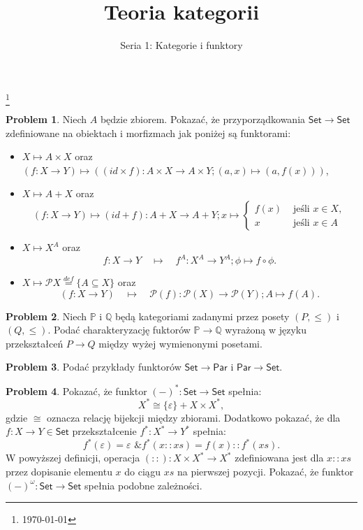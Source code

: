 \documentclass[10pt]{amsart}
\title{Teoria kategorii}
\author{Seria 1: Kategorie i funktory}
\theoremstyle{plain}
\theoremstyle{definition}
\newtheorem{problem}{Problem}
\numberwithin{equation}{section}
\newcommand\blfootnote[1]{%
  \begingroup
  \renewcommand\thefootnote{}\footnote{#1}%
  \addtocounter{footnote}{-1}%
  \endgroup
}
\begin{document}
\maketitle

\blfootnote{\today}


\begin{problem}
Niech $A$ będzie zbiorem. Pokazać, że przyporządkowania $\mathsf{Set}\to \mathsf{Set}$ zdefiniowane na obiektach i morfizmach jak poniżej są funktorami:
\begin{itemize}
\item $X\mapsto A\times X$ oraz $(f:X\to Y)\mapsto \left ((id \times f):A\times X\to A\times Y; (a,x)\mapsto (a,f(x))\right )$,
\item $X\mapsto A+ X$ oraz $$(f:X\to Y)\mapsto (id + f):A+ X\to A+ Y; x \mapsto \left \{ \begin{array}{cc}f(x)  &\text{ jeśli }x\in X, \\ x &\text{ jeśli }x\in A \end{array}\right. $$
\item $X\mapsto X^A$ oraz 
$$
f:X\to Y\quad \mapsto \quad f^A:X^A\to Y^A; \phi\mapsto f\circ \phi. 
$$
\item $X\mapsto \mathcal{P}X\stackrel{def}{=} \{ A\subseteq X \}$ oraz 
$$
(f:X\to Y)\quad \mapsto \quad \mathcal{P}(f):\mathcal{P}(X)\to \mathcal{P}(Y); A\mapsto f(A). 
$$
\end{itemize}
\end{problem}
%
\begin{problem}
Niech $\mathbb{P}$ i $\mathbb{Q}$ będą kategoriami zadanymi przez posety $(P,\leq)$ i $(Q,\leq)$. Podać charakteryzację fuktorów $\mathbb{P}\to \mathbb{Q}$ wyrażoną w języku przekształceń $P\to Q$ między wyżej wymienonymi posetami.
\end{problem}

\begin{problem}
Podać przykłady funktorów $\mathsf{Set}\to \mathsf{Par}$ i $\mathsf{Par}\to \mathsf{Set}$. 
\end{problem}

\begin{problem}
Pokazać, że funktor $(-)^\ast: \mathsf{Set}\to \mathsf{Set}$ spełnia:
$$
X^\ast \cong \{ \varepsilon \} + X\times X^\ast,
$$
gdzie $\cong$ oznacza relację bijekcji między zbiorami. Dodatkowo pokazać, że dla $f:X\to Y\in \mathsf{Set}$
przekształcenie $f^\ast: X^\ast \to Y^\ast$ spełnia:
$$
f^\ast (\varepsilon) = \varepsilon \text{ \& } f^\ast (x :: xs) = f(x) :: f^\ast (xs).
$$
W powyższej definicji, operacja $ (::) : X\times X^\ast \to X^\ast$ zdefiniowana jest dla $x :: xs$ przez dopisanie elementu $x$ do ciągu $xs$ na pierwszej pozycji. Pokazać, że funktor $(-)^\omega : \mathsf{Set}\to \mathsf{Set}$ spełnia podobne zależności.
\end{problem}
\end{document}
